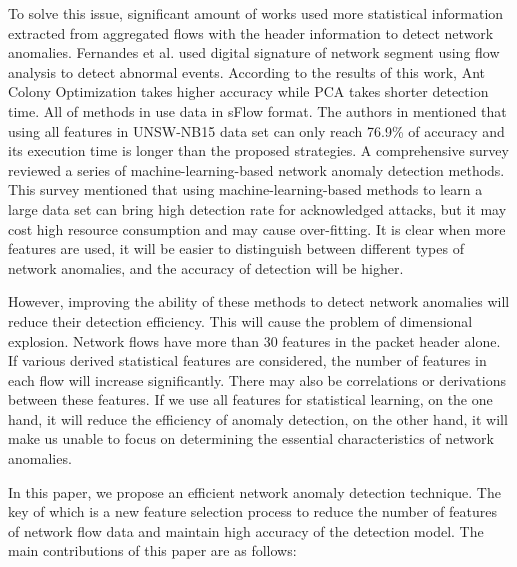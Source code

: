 \documentclass{ieeeaccess}
\theoremstyle{definition}
\begin{document}
To solve this issue, significant amount of works used more statistical information extracted from aggregated flows with the header information to detect network anomalies. Fernandes et al.\cite{Fernandes2015} used digital signature of network segment using flow analysis to detect abnormal events. According to the results of this work, Ant Colony Optimization takes higher accuracy while PCA takes shorter detection time. All of methods in \cite{Fernandes2015} use data in sFlow format. The authors in \cite{Anwer2018} mentioned that using all features in UNSW-NB15 data set \cite{UNSW-2015} can only reach 76.9\% of accuracy and its execution time is longer than the proposed strategies. A comprehensive survey \cite{Fernandes2019} reviewed a series of machine-learning-based network anomaly detection methods. This survey mentioned that using machine-learning-based methods to learn a large data set can bring high detection rate for acknowledged attacks, but it may cost high resource consumption and may cause over-fitting.  It is clear when more features are used, it will be easier to distinguish between different types of network anomalies, and the accuracy of detection will be higher.

However, improving the ability of these methods to detect network anomalies will reduce their detection efficiency.
This will cause the problem of dimensional explosion. Network flows have more than 30 features in the packet header alone. If various derived statistical features are considered, the number of features in each flow will increase significantly. There may also be correlations or derivations between these features. If we use all features for statistical learning, on the one hand, it will reduce the efficiency of anomaly detection, on the other hand, it will make us unable to focus on determining the essential characteristics of network anomalies.

In this paper, we propose an efficient network anomaly detection technique. The key of which is a new feature selection process to reduce the number of features of network flow data and maintain high accuracy of the detection model. The main contributions of this paper are as follows:
\end{document}
